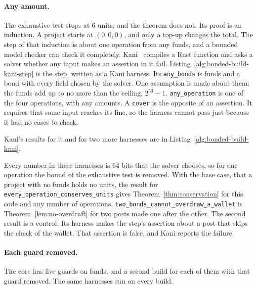 \paragraph{Any amount.}
The exhaustive test stops at 6 units, and the theorem does not. Its proof
is an induction. A project starts at $(0,0,0)$, and only a top-up changes
the total. The step of that induction is about one operation from any
funds, and a bounded model checker can check it completely.
Kani~ compiles a Rust function and asks a solver
whether any input makes an assertion in it fail.
Listing~\ref{alg:bonded-build-kani-step} is the step, written as a Kani
harness. Its \texttt{any\_bonds} is funds and a bond with every field
chosen by the solver. One assumption is made about them: the funds add up
to no more than the ceiling, $2^{53}-1$. \texttt{any\_operation} is one
of the four operations, with any amounts. A \texttt{cover} is the opposite
of an assertion. It requires that some input reaches its line, so the
harness cannot pass just because it had no cases to check.


Kani's results for it and for two more harnesses are in
Listing~\ref{alg:bonded-build-kani}.


Every number in these harnesses is 64 bits that the solver chooses, so for
one operation the bound of the exhaustive test is removed. With the base
case, that a project with no funds holds no units, the result for
\texttt{every\_operation\_conserves\_units} gives
Theorem~\ref{thm:conservation} for this code and any number of operations.
\texttt{two\_bonds\_cannot\_overdraw\_a\_wallet} is
Theorem~\ref{lem:no-overdraft} for two posts made one after the other. The
second result is a control. Its harness makes the step's assertion about
a post that skips the check of the wallet. That assertion is false, and
Kani reports the failure.

\paragraph{Each guard removed.}
The core has five guards on funds, and a second build for each of them
with that guard removed. The same harnesses run on every build.

